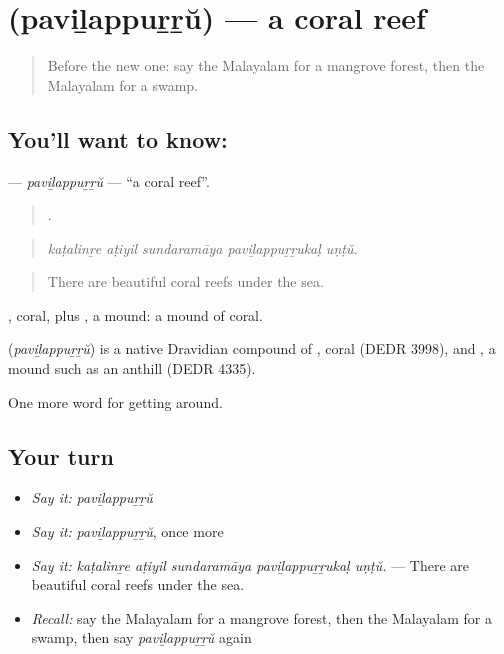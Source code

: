 \section[\texorpdfstring{\ml{പവിഴപ്പുറ്റ്} (paviḻappuṟṟŭ)}{പവിഴപ്പുറ്റ് (paviḻappuṟṟŭ)}]{ (paviḻappuṟṟŭ) — a coral reef}

\label{lesson:ML-C498-pavilappurru}



\begin{quote}
Before the new one: say the Malayalam for a mangrove forest, then the Malayalam for a swamp.
\end{quote}

\subsection*{You'll want to know: }
\textbf{} — \emph{paviḻappuṟṟŭ} — \textquotedblleft{}a coral reef\textquotedblright{}.

\begin{quote}
    .
\end{quote}

\begin{quote}
\emph{kaṭalinṟe aṭiyil sundaramāya paviḻappuṟṟukaḷ uṇṭŭ.}
\end{quote}

\begin{quote}
There are beautiful coral reefs under the sea.
\end{quote}

, coral, plus , a mound: a mound of coral.

\begin{cousinweb}
\textbf{} (\emph{paviḻappuṟṟŭ}) is a native Dravidian compound of , coral (DEDR 3998), and , a mound such as an anthill (DEDR 4335).
\end{cousinweb}

\begin{grammarlens}[title={What you've built}]
One more word for getting around.
\end{grammarlens}

\subsection*{Your turn}
\begin{itemize}
\raggedright
  \item \emph{Say it:} \emph{paviḻappuṟṟŭ}
  \item \emph{Say it:} \emph{paviḻappuṟṟŭ}, once more
  \item \emph{Say it:} \emph{kaṭalinṟe aṭiyil sundaramāya paviḻappuṟṟukaḷ uṇṭŭ.} — There are beautiful coral reefs under the sea.
  \item \emph{Recall:} say the Malayalam for a mangrove forest, then the Malayalam for a swamp, then say \emph{paviḻappuṟṟŭ} again
\end{itemize}

